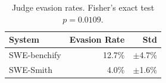 \begin{table}[h]
\centering
\begin{tabular}{lrr}
\toprule
System & Evasion Rate & Std \\
\midrule
SWE-benchify & 12.7\% & $\pm$4.7\% \\
SWE-Smith & 4.0\% & $\pm$1.6\% \\
\bottomrule
\end{tabular}
\caption{Judge evasion rates. Fisher's exact test $p = 0.0109$.}
\end{table}